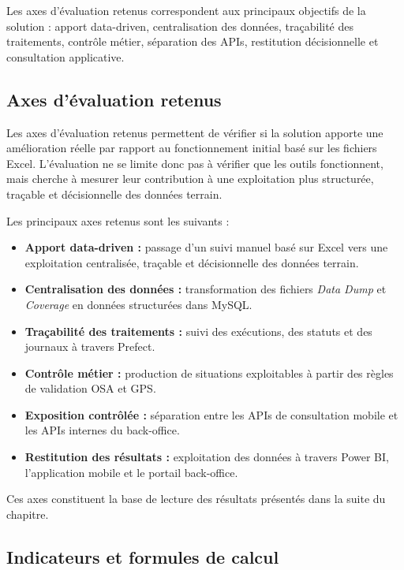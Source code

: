 Les axes d’évaluation retenus correspondent aux principaux objectifs de la solution : apport data-driven, centralisation des données, traçabilité des traitements, contrôle métier, séparation des APIs, restitution décisionnelle et consultation applicative.

\subsection{Axes d’évaluation retenus}

Les axes d’évaluation retenus permettent de vérifier si la solution apporte une amélioration réelle par rapport au fonctionnement initial basé sur les fichiers Excel. L’évaluation ne se limite donc pas à vérifier que les outils fonctionnent, mais cherche à mesurer leur contribution à une exploitation plus structurée, traçable et décisionnelle des données terrain.

Les principaux axes retenus sont les suivants :

\begin{itemize}
    \item \textbf{Apport data-driven :} passage d’un suivi manuel basé sur Excel vers une exploitation centralisée, traçable et décisionnelle des données terrain.
    \item \textbf{Centralisation des données :} transformation des fichiers \textit{Data Dump} et \textit{Coverage} en données structurées dans MySQL.
    \item \textbf{Traçabilité des traitements :} suivi des exécutions, des statuts et des journaux à travers Prefect.
    \item \textbf{Contrôle métier :} production de situations exploitables à partir des règles de validation OSA et GPS.
    \item \textbf{Exposition contrôlée :} séparation entre les APIs de consultation mobile et les APIs internes du back-office.
    \item \textbf{Restitution des résultats :} exploitation des données à travers Power BI, l’application mobile et le portail back-office.
\end{itemize}

Ces axes constituent la base de lecture des résultats présentés dans la suite du chapitre.

\subsection{Indicateurs et formules de calcul}

